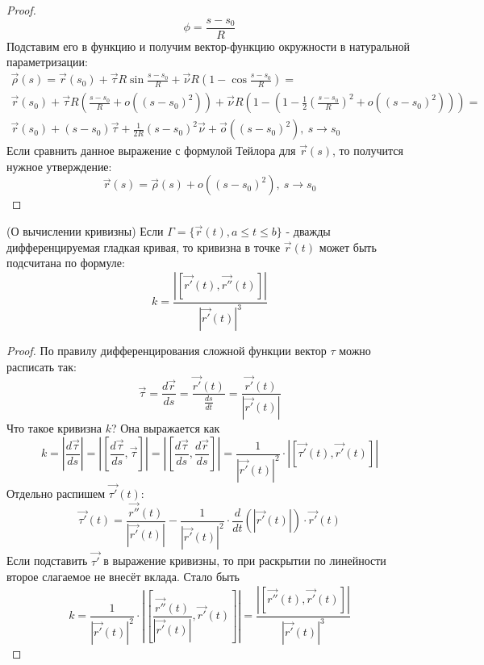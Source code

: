 \begin{proof}
	\[
		\phi = \frac{s - s_0}{R}
	\]
	Подставим его в функцию и получим вектор-функцию окружности в натуральной параметризации:
	\begin{multline*}
		\vec{\rho}(s) = \vec{r}(s_0) + \vec{\tau}R \sin \frac{s - s_0}{R} + \vec{\nu}R\left(1 - \cos \frac{s - s_0}{R}\right) =
		\\
		\vec{r}(s_0) + \vec{\tau}R \left(\frac{s - s_0}{R} + o\left((s - s_0)^2\right)\right) + \vec{\nu}R \left(1 - \left(1 - \frac{1}{2}\left(\frac{s - s_0}{R}\right)^2 + o\left((s - s_0)^2\right)\right)\right) =
		\\
		\vec{r}(s_0) + (s - s_0)\vec{\tau} + \frac{1}{2R}(s - s_0)^2\vec{\nu} + \vec{o}\left((s - s_0)^2\right),\ s \to s_0
	\end{multline*}
	Если сравнить данное выражение с формулой Тейлора для $\vec{r}(s)$, то получится нужное утверждение:
	\[
		\vec{r}(s) = \vec{\rho}(s) + o\left((s - s_0)^2\right),\ s \to s_0
	\]
\end{proof}

\begin{theorem} (О вычислении кривизны)
	Если $\Gamma = \{\vec{r}(t), a \le t \le b\}$ - дважды дифференцируемая гладкая кривая, то кривизна в точке $\vec{r}(t)$ может быть подсчитана по формуле:
	\[
		k = \frac{\left|\left[\vec{r'}(t), \vec{r''}(t)\right]\right|}{\left|\vec{r'}(t)\right|^3}
	\]
\end{theorem}

\begin{proof}
	По правилу дифференцирования сложной функции вектор $\tau$ можно расписать так:
	\[
		\vec{\tau} = \frac{d\vec{r}}{ds} = \frac{\vec{r'}(t)}{\frac{ds}{dt}} = \frac{\vec{r'}(t)}{|\vec{r'}(t)|}
	\]
	Что такое кривизна $k$? Она выражается как
	\[
		k = \left|\frac{d\vec{\tau}}{ds}\right| = \left|\left[\frac{d\vec{\tau}}{ds}, \vec{\tau}\right]\right| = \left|\left[\frac{d\vec{\tau}}{ds}, \frac{d\vec{r}}{ds}\right]\right| = \frac{1}{|\vec{r'}(t)|^2} \cdot \left|\left[\vec{\tau'}(t), \vec{r'}(t)\right]\right|
	\]
	Отдельно распишем $\vec{\tau'}(t)$:
	\[
		\vec{\tau'}(t) = \frac{\vec{r''}(t)}{\left|\vec{r'}(t)\right|} - \frac{1}{\left|\vec{r'}(t)\right|^2} \cdot \frac{d}{dt}\left(\left|\vec{r'}(t)\right|\right) \cdot \vec{r'}(t)
	\]
	Если подставить $\vec{\tau'}$ в выражение кривизны, то при раскрытии по линейности второе слагаемое не внесёт вклада. Стало быть
	\[
		k = \frac{1}{\left|\vec{r'}(t)\right|^2} \cdot \left|\left[\frac{\vec{r''}(t)}{\left|\vec{r'}(t)\right|}, \vec{r'}(t)\right]\right| = \frac{\left|\left[\vec{r''}(t), \vec{r'}(t)\right]\right|}{\left|\vec{r'}(t)\right|^3}
	\]
\end{proof}


